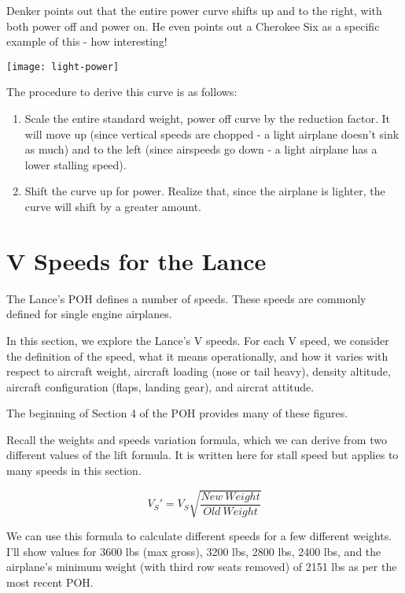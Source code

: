 Denker points out that the entire power curve shifts up and to the right, with both power off and power on. He even points out a Cherokee Six as a specific example of this - how interesting!

\texttt{[image: light-power]}

The procedure to derive this curve is as follows:

\begin{enumerate}
\item Scale the entire standard weight, power off curve by the reduction factor. It will move up (since vertical speeds are chopped - a light airplane doesn't sink as much) and to the left (since airspeeds go down - a light airplane has a lower stalling speed).
\item Shift the curve up for power. Realize that, since the airplane is lighter, the curve will shift by a greater amount.
\end{enumerate}


\section{V Speeds for the Lance}

The Lance's POH defines a number of speeds. These speeds are commonly defined for single engine airplanes.

In this section, we explore the Lance's V speeds. For each V speed, we consider the definition of the speed, what it means operationally, and how it varies with respect to aircraft weight, aircraft loading (nose or tail heavy), density altitude, aircraft configuration (flaps, landing gear), and aircrat attitude.

The beginning of Section 4 of the POH provides many of these figures.

Recall the weights and speeds variation formula, which we can derive from two different values of the lift formula. It is written here for stall speed but applies to many speeds in this section.

\begin{equation}
V_S' = V_S \sqrt{\frac{New\ Weight}{Old\ Weight}}
\end{equation}

We can use this formula to calculate different speeds for a few different weights. I'll show values for 3600 lbs (max gross), 3200 lbs, 2800 lbs, 2400 lbs, and the airplane's minimum weight (with third row seats removed) of 2151 lbs as per the most recent POH.

